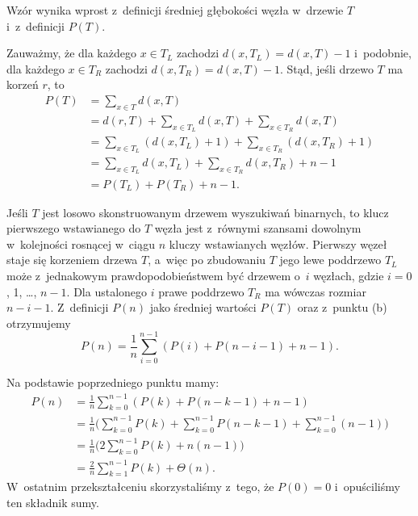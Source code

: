 \subproblem %
Wzór wynika wprost z~definicji średniej głębokości węzła w~drzewie $T$ i~z~definicji $P(T)$.

\subproblem %
Zauważmy, że dla każdego $x\in T_L$ zachodzi $d(x,T_L)=d(x,T)-1$ i~podobnie, dla każdego $x\in T_R$ zachodzi $d(x,T_R)=d(x,T)-1$.
Stąd, jeśli drzewo $T$ ma korzeń $r$, to
\begin{align*}
	P(T) &= \sum_{x\in T}d(x,T) \\
	&= d(r,T)+\sum_{x\in T_L}d(x,T)+\sum_{x\in T_R}d(x,T) \\[1mm]
	&= \sum_{x\in T_L}(d(x,T_L)+1)+\sum_{x\in T_R}(d(x,T_R)+1) \\[1mm]
	&= \sum_{x\in T_L}d(x,T_L)+\sum_{x\in T_R}d(x,T_R)+n-1 \\[1mm]
	&= P(T_L)+P(T_R)+n-1.
\end{align*}

\subproblem %
Jeśli $T$ jest losowo skonstruowanym drzewem wyszukiwań binarnych, to klucz pierwszego wstawianego do $T$ węzła jest z~równymi szansami dowolnym w~kolejności rosnącej w~ciągu $n$ kluczy wstawianych węzłów.
Pierwszy węzeł staje się korzeniem drzewa $T$, a~więc po zbudowaniu $T$ jego lewe poddrzewo $T_L$ może z~jednakowym prawdopodobieństwem być drzewem o~$i$ węzłach, gdzie $i=0$, 1, \dots, $n-1$.
Dla ustalonego $i$ prawe poddrzewo $T_R$ ma wówczas rozmiar $n-i-1$.
Z~definicji $P(n)$ jako średniej wartości $P(T)$ oraz z~punktu (b) otrzymujemy
\[
	P(n) = \frac{1}{n}\sum_{i=0}^{n-1}(P(i)+P(n-i-1)+n-1).
\]

\subproblem %
Na podstawie poprzedniego punktu mamy:
\begin{align*}
	P(n) &= \frac{1}{n}\sum_{k=0}^{n-1}(P(k)+P(n-k-1)+n-1) \\
	&= \frac{1}{n}\biggl(\sum_{k=0}^{n-1}P(k)+\sum_{k=0}^{n-1}P(n-k-1)+\sum_{k=0}^{n-1}(n-1)\biggr) \\
	&= \frac{1}{n}\biggl(2\sum_{k=0}^{n-1}P(k)+n(n-1)\biggr) \\
	&= \frac{2}{n}\sum_{k=1}^{n-1}P(k)+\Theta(n).
\end{align*}
W~ostatnim przekształceniu skorzystaliśmy z~tego, że $P(0)=0$ i~opuściliśmy ten składnik sumy.

\subproblem %
\subproblem %


\subproblem %
\subproblem %
\subproblem %

\subproblem %

\endinput
